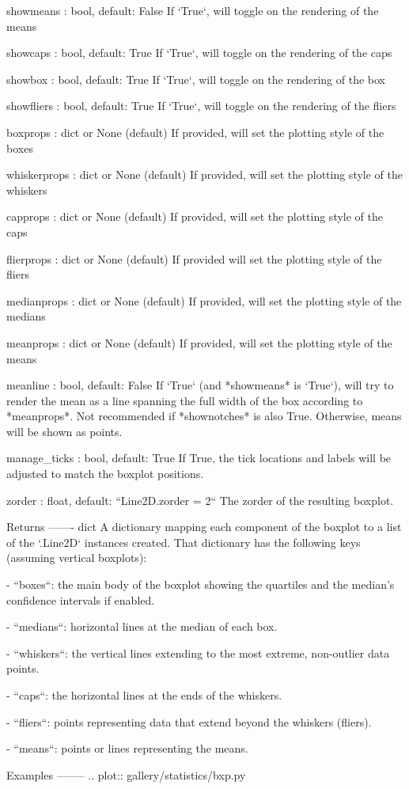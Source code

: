 \begin{DoxyVerb}
showmeans : bool, default: False
  If `True`, will toggle on the rendering of the means

showcaps  : bool, default: True
  If `True`, will toggle on the rendering of the caps

showbox  : bool, default: True
  If `True`, will toggle on the rendering of the box

showfliers : bool, default: True
  If `True`, will toggle on the rendering of the fliers

boxprops : dict or None (default)
  If provided, will set the plotting style of the boxes

whiskerprops : dict or None (default)
  If provided, will set the plotting style of the whiskers

capprops : dict or None (default)
  If provided, will set the plotting style of the caps

flierprops : dict or None (default)
  If provided will set the plotting style of the fliers

medianprops : dict or None (default)
  If provided, will set the plotting style of the medians

meanprops : dict or None (default)
  If provided, will set the plotting style of the means

meanline : bool, default: False
  If `True` (and *showmeans* is `True`), will try to render the mean
  as a line spanning the full width of the box according to
  *meanprops*. Not recommended if *shownotches* is also True.
  Otherwise, means will be shown as points.

manage_ticks : bool, default: True
  If True, the tick locations and labels will be adjusted to match the
  boxplot positions.

zorder : float, default: ``Line2D.zorder = 2``
  The zorder of the resulting boxplot.

Returns
-------
dict
  A dictionary mapping each component of the boxplot to a list
  of the `.Line2D` instances created. That dictionary has the
  following keys (assuming vertical boxplots):

  - ``boxes``: the main body of the boxplot showing the
    quartiles and the median's confidence intervals if
    enabled.

  - ``medians``: horizontal lines at the median of each box.

  - ``whiskers``: the vertical lines extending to the most
    extreme, non-outlier data points.

  - ``caps``: the horizontal lines at the ends of the
    whiskers.

  - ``fliers``: points representing data that extend beyond
    the whiskers (fliers).

  - ``means``: points or lines representing the means.

Examples
--------
.. plot:: gallery/statistics/bxp.py\end{DoxyVerb}
